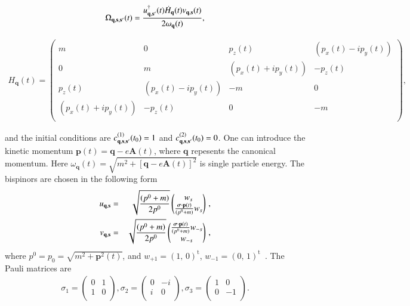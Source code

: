 \documentclass[prl,twocolumn,floatfix,amsmath,nofootinbib,superscriptaddress,amssymb,preprintnumbers,floatfix]{revtex4-1}
\begin{document}
\begin{equation}\label{eq:4}
\Omega_{\bf{q},\bf{s},\bf{s}'}(t)=\frac{u^\dagger_{\bf{q},\bf{s}'}(t) \dot{H}_{\bf{q}}(t) v_{\bf{q},\bf{s}}(t)}{2\omega_{\bf{q}}(t)},
\end{equation}
\begin{widetext}
\begin{align}\label{eq:5}
H_\mathbf{q}(t)=
\left(
\begin{array}{cccc}
m  & 0 &  p_z (t) &  (p_x (t)-ip_y (t)) \\
0 & m  &  (p_x (t)+ip_y (t)) & - p_z (t) \\
p_z (t) &  (p_x (t)-ip_y (t)) & -m & 0 \\
(p_x (t)+ip_y (t)) & - p_z (t) & 0 & -m  \\
\end{array}
\right),
\end{align}
\end{widetext}
and the initial conditions are $c_{\bf{q},\bf{s},\bf{s}'}^{(1)}(t_0)=1$ and $c_{\bf{q},\bf{s},\bf{s}'}^{(2)}(t_0)=0$. One can introduce the kinetic momentum $\mathbf{p}(t)=\mathbf{q} - e \mathbf{A}(t)$, where $\mathbf{q}$ repesents the canonical momentum. Here $\omega_{\mathbf{q}}(t)=\sqrt{m^2 + {[\mathbf{q} - e \mathbf{A}(t)]}^2}$ is single particle energy. The bispinors are chosen in the following form
\begin{eqnarray}
u_{\bf{q},s} &=& \sqrt{\frac{(p^0 +m)}{2p^0}}
\begin{pmatrix}
w_s\\
\frac{\boldsymbol{\sigma} \cdot \mathbf{p}(t)}{(p^0 +m)} w_s
\end{pmatrix} \,, \label{eq:6}\\
v_{\bf{q},s} &=& \sqrt{\frac{(p^0 +m)}{2p^0}}
\begin{pmatrix}
\frac{\boldsymbol{\sigma} \cdot \mathbf{p}(t)}{(p^0 +m)} w_{-s}\\
w_{-s}
\end{pmatrix} \,,\label{eq:7}
\end{eqnarray}
where $p^0 = p_0 = \sqrt{m^2 + \boldsymbol{p}^2(t)}$, and $w_{+1} = (1, \, 0)^\mathrm{t}$, $w_{-1} = (0, \, 1)^\mathrm{t}$ \,. The Pauli matrices are 
\begin{align}\label{eq:8}
\sigma_1=\left(
\begin{array}{cc}
0 & 1 \\
1 & 0 \\
\end{array}
\right), \sigma_2=\left(
\begin{array}{cc}
0 & -i \\
i & 0 \\
\end{array}
\right), \sigma_3=\left(
\begin{array}{cc}
1 & 0 \\
0 & -1 \\
\end{array}
\right).
\end{align}
    
\end{document}

